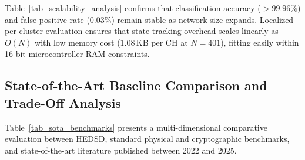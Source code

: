 \documentclass[conference]{IEEEtran}
\begin{document}
\begin{enumerate}
\begin{table}[htbp]
\caption{Analytical Scalability Performance Benchmark Across Network Sizes}
\label{tab_scalability_analysis}
\centering
\small
\renewcommand{\arraystretch}{1.15}
\end{table}

Table~\ref{tab_scalability_analysis} confirms that classification accuracy ($>99.96\%$) and false positive rate ($0.03\%$) remain stable as network size expands. Localized per-cluster evaluation ensures that state tracking overhead scales linearly as $O(N)$ with low memory cost ($1.08\,\text{KB}$ per CH at $N=401$), fitting easily within 16-bit microcontroller RAM constraints.

\subsection{State-of-the-Art Baseline Comparison and Trade-Off Analysis}
Table~\ref{tab_sota_benchmarks} presents a multi-dimensional comparative evaluation between HEDSD, standard physical and cryptographic benchmarks, and state-of-the-art literature published between 2022 and 2025.


\end{enumerate}
\end{document}
